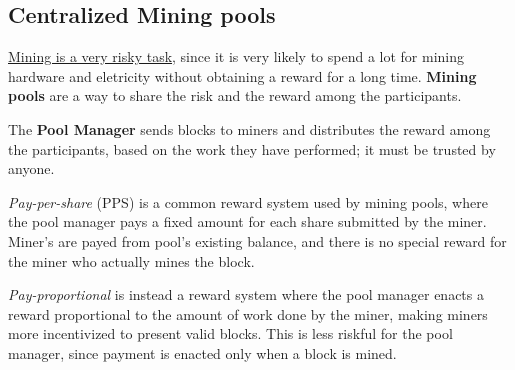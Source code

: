 \subsection{Centralized Mining pools}
\ul{Mining is a very risky task}, since it is very likely to spend a lot for mining hardware and eletricity without
obtaining a reward for a long time.
\textbf{Mining pools} are a way to share the risk and the reward among the participants. 

The \textbf{Pool Manager} sends blocks to miners and distributes the reward among the participants, based on the work they have performed; it must be trusted by anyone.

\textit{Pay-per-share} (PPS) is a common reward system used by mining pools, where the pool manager pays a fixed amount for each share submitted by the miner.
Miner's are payed from pool's existing balance, and there is no special reward for the miner who actually mines the block.

\textit{Pay-proportional} is instead a reward system where the pool manager enacts a reward proportional to the amount of work done by the miner, making miners more incentivized to present valid blocks.
This is less riskful for the pool manager, since payment is enacted only when a block is mined.

